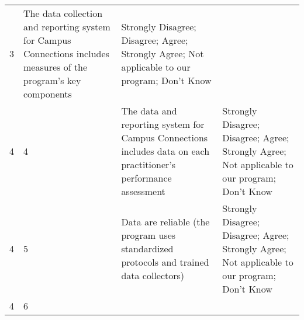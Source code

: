 \documentclass[]{article}
\begin{document}
\begin{longtable}[]{@{}llll@{}}
\begin{minipage}[t]{0.04\columnwidth}
3\strut
\end{minipage} & \begin{minipage}[t]{0.41\columnwidth}\raggedright\strut
The data collection and reporting system for Campus Connections includes
measures of the program's key components\strut
\end{minipage} & \begin{minipage}[t]{0.39\columnwidth}\raggedright\strut
Strongly Disagree; Disagree; Agree; Strongly Agree; Not applicable to
our program; Don't Know\strut
\end{minipage}\tabularnewline
\begin{minipage}[t]{0.05\columnwidth}\raggedright\strut
4\strut
\end{minipage} & \begin{minipage}[t]{0.04\columnwidth}\raggedright\strut
4\strut
\end{minipage} & \begin{minipage}[t]{0.41\columnwidth}\raggedright\strut
The data and reporting system for Campus Connections includes data on
each practitioner's performance assessment\strut
\end{minipage} & \begin{minipage}[t]{0.39\columnwidth}\raggedright\strut
Strongly Disagree; Disagree; Agree; Strongly Agree; Not applicable to
our program; Don't Know\strut
\end{minipage}\tabularnewline
\begin{minipage}[t]{0.05\columnwidth}\raggedright\strut
4\strut
\end{minipage} & \begin{minipage}[t]{0.04\columnwidth}\raggedright\strut
5\strut
\end{minipage} & \begin{minipage}[t]{0.41\columnwidth}\raggedright\strut
Data are reliable (the program uses standardized protocols and trained
data collectors)\strut
\end{minipage} & \begin{minipage}[t]{0.39\columnwidth}\raggedright\strut
Strongly Disagree; Disagree; Agree; Strongly Agree; Not applicable to
our program; Don't Know\strut
\end{minipage}\tabularnewline
\begin{minipage}[t]{0.05\columnwidth}\raggedright\strut
4\strut
\end{minipage} & \begin{minipage}[t]{0.04\columnwidth}\raggedright\strut
6\strut
\end{minipage} & \begin{minipage}[t]{0.41\columnwidth}\raggedright\strut

\end{minipage}
\end{longtable}
\end{document}
